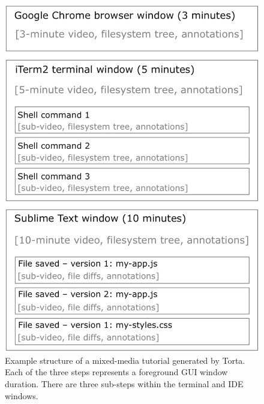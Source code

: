 \begin{figure}

\centering
\includegraphics[width=0.85\columnwidth]{figures/torta/torta-schematic.png}

\caption{Example structure of a mixed-media tutorial generated by
Torta. Each of the three steps represents a foreground GUI window duration. There are
three sub-steps within the terminal and IDE windows.}

\label{fig:torta-schematic}
\vspace{-1em} %
\end{figure}


